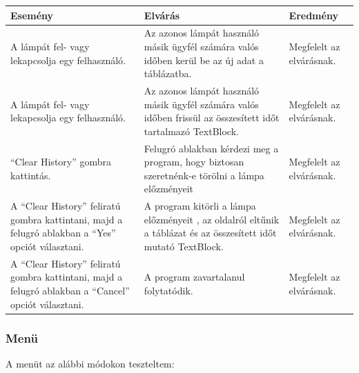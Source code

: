\documentclass[a4paper,12pt]{report}
\begin{document}
    \begin{center}
        \begin{tabular}{ | m{4.5cm} | m{4.5cm} | m{4.5cm} |}
            \hline
            Esemény & Elvárás & Eredmény \\ \hline
            A lámpát fel- vagy lekapcsolja egy felhasználó. & Az azonos lámpát használó másik ügyfél számára valós időben kerül be az új adat
            a táblázatba. & Megfelelt az elvárásnak. \\ \hline
            A lámpát fel- vagy lekapcsolja egy felhasználó. & Az azonos lámpát használó másik ügyfél számára valós időben frissül az összesített
            időt tartalmazó TextBlock. & Megfelelt az elvárásnak. \\ \hline
            ``Clear History'' gombra kattintás. & Felugró ablakban kérdezi meg a program, hogy biztosan szeretnénk-e törölni a lámpa előzményeit
            & Megfelelt az elvárásnak.\\ \hline
            A ``Clear History'' feliratú gombra kattintani, majd a felugró ablakban a ``Yes'' opciót választani. & A program kitörli a lámpa előzményeit
            , az oldalról eltűnik a táblázat és az összesített időt mutató TextBlock. & Megfelelt az elvárásnak.\\ \hline
            A ``Clear History'' feliratú gombra kattintani, majd a felugró ablakban a ``Cancel'' opciót választani. & A program zavartalanul folytatódik. &
            Megfelelt az elvárásnak. \\
            \hline
        \end{tabular}
    \end{center}

    \subsubsection{Menü}
    A menüt az alábbi módokon teszteltem:
\end{document}
